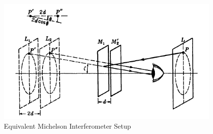	\par
	\begin{figure}[bth]
		\begin{center}
			\includegraphics[width=1.1\linewidth]{gfx/e1}
		\end{center}
	\caption[Equivalent Michelson Interferometer Setup]{Equivalent Michelson Interferometer Setup}
	\label{e1}
	\end{figure}

